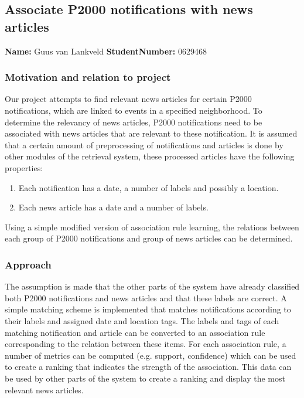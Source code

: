 \subsection{Associate P2000 notifications with news articles}
\textbf{Name:} Guus van Lankveld \indent \textbf{StudentNumber:} 0629468

\subsubsection*{Motivation and relation to project}
Our project attempts to find relevant news articles for certain P2000 notifications, which are linked to events in a specified neighborhood. To determine the relevancy of news articles, P2000 notifications need to be associated with news articles that are relevant to these notification. It is assumed that a certain amount of preprocessing of notifications and articles is done by other modules of the retrieval system, these processed articles have the following properties:
\begin{enumerate}
\item Each notification has a date, a number of labels and possibly a location.
\item Each news article has a date and a number of labels.
\end{enumerate}
Using a simple modified version of association rule learning, the relations between each group of P2000 notifications and group of news articles can be determined. 

\subsubsection*{Approach}
The assumption is made that the other parts of the system have already classified both P2000 notifications and news articles and that these labels are correct. A simple matching scheme is implemented that matches notifications according to their labels and assigned date and location tags. The labels and tags of each matching notification and article can be converted to an association rule corresponding to the relation between these items. For each association rule, a number of metrics can be computed (e.g. support, confidence) which can be used to create a ranking that indicates the strength of the association. This data can be used by other parts of the system to create a ranking and display the most relevant news articles.

